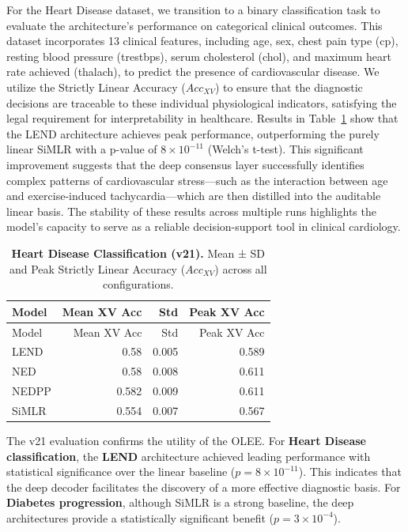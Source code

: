 \documentclass[
  letterpaper,
]{report}
\begin{document}
For the Heart Disease dataset, we transition to a binary classification
task to evaluate the architecture's performance on categorical clinical
outcomes. This dataset incorporates 13 clinical features, including age,
sex, chest pain type (cp), resting blood pressure (trestbps), serum
cholesterol (chol), and maximum heart rate achieved (thalach), to
predict the presence of cardiovascular disease. We utilize the Strictly
Linear Accuracy (\(Acc_{XV}\)) to ensure that the diagnostic decisions
are traceable to these individual physiological indicators, satisfying
the legal requirement for interpretability in healthcare. Results in
Table~\ref{tbl-heart-results} show that the LEND architecture achieves
peak performance, outperforming the purely linear SiMLR with a p-value
of \(8 \times 10^{-11}\) (Welch's t-test). This significant improvement
suggests that the deep consensus layer successfully identifies complex
patterns of cardiovascular stress---such as the interaction between age
and exercise-induced tachycardia---which are then distilled into the
auditable linear basis. The stability of these results across multiple
runs highlights the model's capacity to serve as a reliable
decision-support tool in clinical cardiology.

\begin{longtable}[]{@{}lrrr@{}}
\caption{\textbf{Heart Disease Classification (v21).} Mean ± SD and Peak
Strictly Linear Accuracy (\(Acc_{XV}\)) across all
configurations.}\label{tbl-heart-results}\tabularnewline
\toprule\noalign{}
Model & Mean XV Acc & Std & Peak XV Acc \\
\midrule\noalign{}
\endfirsthead
\toprule\noalign{}
Model & Mean XV Acc & Std & Peak XV Acc \\
\midrule\noalign{}
\endhead
\bottomrule\noalign{}
\endlastfoot
LEND & 0.58 & 0.005 & 0.589 \\
NED & 0.58 & 0.008 & 0.611 \\
NEDPP & 0.582 & 0.009 & 0.611 \\
SiMLR & 0.554 & 0.007 & 0.567 \\
\end{longtable}

The v21 evaluation confirms the utility of the OLEE. For \textbf{Heart
Disease classification}, the \textbf{LEND} architecture achieved leading
performance with statistical significance over the linear baseline
(\(p = 8 \times 10^{-11}\)). This indicates that the deep decoder
facilitates the discovery of a more effective diagnostic basis. For
\textbf{Diabetes progression}, although SiMLR is a strong baseline, the
deep architectures provide a statistically significant benefit
(\(p = 3 \times 10^{-4}\)).
\end{document}

